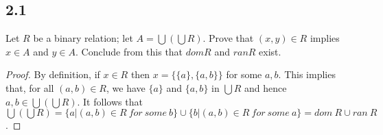 \subsection*{2.1} Let $R$ be a binary relation; let $A = \bigcup (\bigcup R)$. Prove that $(x,y) \in R$ implies $x \in A$ and $y \in A$. Conclude from this that $dom R$ and $ran R$ exist.

\begin{proof}
By definition, if $x \in R$ then $x = \{\{a\}, \{a, b\}\}$ for some $a,b$. This implies that, for all $(a,b) \in R$, we have $\{a\}$ and $\{a,b\}$ in $\bigcup R$ and hence $a, b \in \bigcup(\bigcup R)$. It follows that $\bigcup(\bigcup R) = \{a | (a,b) \in R~for~some~b\} \cup \{b | (a,b) \in R~for~some~a\} = dom~R \cup ran~R$.

\end{proof}

